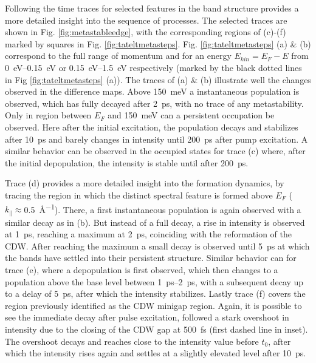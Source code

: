 Following the time traces for selected features in the band structure provides a more detailed insight into the sequence of processes.
The selected traces are shown in Fig. \ref{fig:metastableedge}, with the corresponding regions of (c)-(f) marked by squares in Fig. \ref{fig:tateltmetasteps}.
Fig. \ref{fig:tateltmetasteps} (a) \& (b) correspond to the full range of momentum and for an energy $E_{kin}=E_F-E$ from \qtyrange{0}{0.15}{\electronvolt} or \qtyrange{0.15}{1.5}{\electronvolt} respectively (marked by the black dotted lines in Fig \ref{fig:tateltmetasteps} (a)).
The traces of (a) \& (b) illustrate well the changes observed in the difference maps.
Above \qty{150}{\milli\electronvolt} a instantaneous population is observed, which has fully decayed after \qty{2}{\pico\second}, with no trace of any metastability.
Only in region between $E_F$ and \qty{150}{\milli\electronvolt} can a persistent occupation be observed.
Here after the initial excitation, the population decays and stabilizes after \qty{10}{\pico\second} and barely changes in intensity until \qty{200}{\pico\second} after pump excitation.
A similar behavior can be observed in the occupied states for trace (c) where, after the initial depopulation, the intensity is stable until after \qty{200}{\pico\second}.

Trace (d) provides a more detailed insight into the formation dynamics, by tracing the region in which the distinct spectral feature is formed above $E_F$ ($k_\parallel\approx$\qty{0.5}{\angstrom^{-1}}).
There, a first instantaneous population is again observed with a similar decay as in (b).
But instead of a full decay, a rise in intensity is observed at \qty{1}{\pico\second}, reaching a maximum at \qty{2}{\pico\second}, coinciding with the reformation of the CDW.
After reaching the maximum a small decay is observed until \qty{5}{\pico\second} at which the bands have settled into their persistent structure.
Similar behavior can for trace (e), where a depopulation is first observed, which then changes to a population above the base level between \qtyrange{1}{2}{\pico\second}, with a subsequent decay up to a delay of \qty{5}{\pico\second}, after which the intensity stabilizes.
Lastly trace (f) covers the region previously identified as the CDW minigap region.
Again, it is possible to see the immediate decay after pulse excitation, followed a stark overshoot in intensity due to the closing of the CDW gap at \qty{500}{\femto\second} (first dashed line in inset).
The overshoot decays and reaches close to the intensity value before $t_0$, after which the intensity rises again and settles at a slightly elevated level after \qty{10}{\pico\second}.

